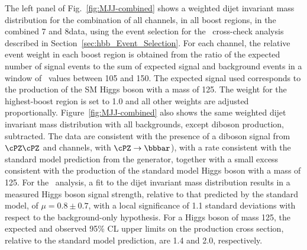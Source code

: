 \documentclass[12pt,twoside,a4paper,cmspaper,final,collab]{cms-tdr}
\begin{document}
The left panel of Fig.~\ref{fig:MJJ-combined} shows a weighted dijet invariant mass distribution
for the combination of all channels, in all
boost regions, in the
combined 7 and 8\TeV data, using the event selection for the \Mjj\
cross-check analysis described in
Section~\ref{sec:hbb_Event_Selection}. For each channel, the relative
event weight in each boost region is obtained from the ratio of the expected number of
signal events to the sum of expected signal and background events in a
window of \Mjj\ values between 105 and 150\GeV. The expected signal
used corresponds to the production of the SM Higgs boson with a mass of
125\GeV. The weight for the
highest-boost region is set to 1.0 and all other weights are adjusted proportionally.
Figure~\ref{fig:MJJ-combined} also shows the same weighted
dijet invariant mass
distribution with all backgrounds, except diboson production, subtracted. The
data are consistent with the presence of a diboson signal from $\cPZ\cPZ$
and \WZ channels, with
$\cPZ\to \bbbar$), with a rate
consistent with the standard model prediction from the {\MADGRAPH}
generator, together with a
small excess consistent with the production
of the standard model Higgs boson with a mass of 125\GeV. For the \Mjj\ analysis, a
fit to the dijet invariant mass distribution results in a measured Higgs boson signal
strength, relative to that predicted by the standard model, of
$\mu = 0.8\pm 0.7$, with a local significance of 1.1 standard deviations
with respect to the background-only hypothesis.
For a Higgs boson of mass 125\GeV, the expected and observed 95\% CL upper limits
on the production cross section, relative to the standard model
prediction, are 1.4 and 2.0, respectively.
\end{document}
